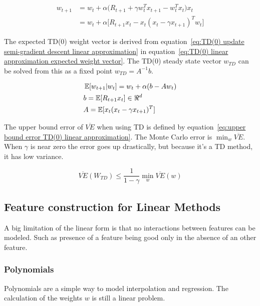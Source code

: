 \begin{equation}
\begin{split}
w_{t+1} & = w_t + \alpha \big( R_{t+1} + \gamma w_t^Tx_{t+1} - w_t^T x_t\big)x_t\\
& = w_t + \alpha \big[R_{t+1}x_t - x_t ( x_t - \gamma x_{t+1} )^Tw_t\big]
\end{split}
\label{eq:TD(0) update semi-gradient descent linear approximation}
\end{equation}

The expected TD(0) weight vector is derived from equation~\ref{eq:TD(0) update semi-gradient descent linear approximation} in equation~\ref{eq:TD(0) linear approximation expected weight vector}. The TD(0) steady state vector $w_{TD}$ can be solved from this as a fixed point $w_{TD} = A^{-1}b$.

\begin{equation}
\begin{split}
& \operatorname{\mathbb{E}}[w_{t+1}| w_t] = w_t + \alpha (b-Aw_t) \\
& b = \operatorname{\mathbb{E}}[R_{t+1}x_t] \in \Re^d \\
& A = \operatorname{\mathbb{E}}[x_t(x_t - \gamma x_{t+1})^T]
\end{split}
\label{eq:TD(0) linear approximation expected weight vector}
\end{equation}

The upper bound error of $\overline{VE}$ when using TD is defined by equation~\ref{eq:upper bound error TD(0) linear approximation}. The Monte Carlo error is $\min_w \overline{VE}$. When $\gamma$ is near zero the error  goes up drastically, but because it's a TD method, it has low variance. 

\begin{equation}
\overline{VE}(W_{TD}) \leq \frac{1}{1-\gamma}\min_w \overline{VE}(w)
\label{eq:upper bound error TD(0) linear approximation}
\end{equation}

\subsection{Feature construction for Linear Methods}
A big limitation of the linear form is that no interactions between features can be modeled. Such as presence of a feature being good only in the absence of an other feature.

\subsubsection{Polynomials}
Polynomials are a simple way to model interpolation and regression. The calculation of the weights $w$ is still a linear problem.

